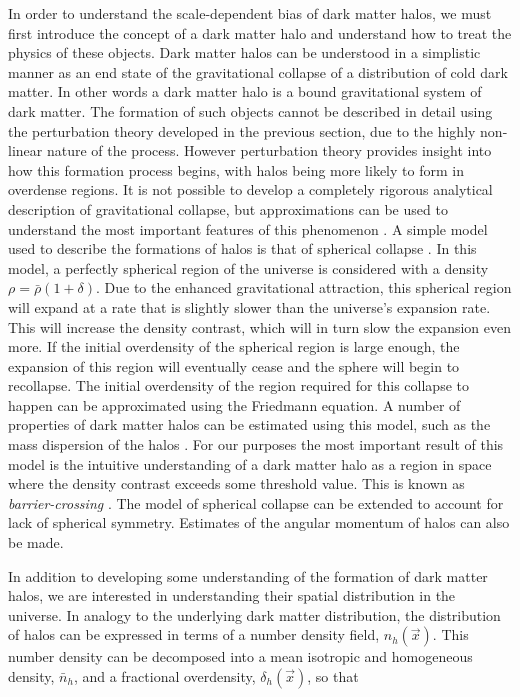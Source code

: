 \documentclass[10pt,letterpaper,final]{iopart}
\numberwithin{equation}{subsection}
\begin{document}
In order to understand the scale-dependent bias of dark matter halos, we must first introduce the concept of a dark matter halo and understand how to treat the physics of these objects. Dark matter halos can be understood in a simplistic manner as an end state of the gravitational collapse of a distribution of cold dark matter. In other words a dark matter halo is a bound gravitational system of dark matter. The formation of such objects cannot be described in detail using the perturbation theory developed in the previous section, due to the highly non-linear nature of the process. However perturbation theory provides insight into how this formation process begins, with halos being more likely to form in overdense regions. It is not possible to develop a completely rigorous analytical description of gravitational collapse, but approximations can be used to understand the most important features of this phenomenon \cite{Schneider}\cite{Dodelson}. A simple model used to describe the formations of halos is that of spherical collapse \cite{Schneider}\cite{Dodelson}. In this model, a perfectly spherical region of the universe is considered with a density $\rho = \bar{\rho}\left(1 + \delta \right)$. Due to the enhanced gravitational attraction, this spherical region will expand at a rate that is slightly slower than the universe's expansion rate. This will increase the density contrast, which will in turn slow the expansion even more. If the initial overdensity of the spherical region is large enough, the expansion of this region will eventually cease and the sphere will begin to recollapse. The initial overdensity of the region required for this collapse to happen can be approximated using the Friedmann equation. A number of properties of dark matter halos can be estimated using this model, such as the mass dispersion of the halos \cite{Schneider}\cite{Dodelson}\cite{PressSchec}. For our purposes the most important result of this model is the intuitive understanding of a dark matter halo as a region in space where the density contrast exceeds some threshold value. This is known as \emph{barrier-crossing} \cite{Schneider}\cite{Dodelson}\cite{PressSchec}\cite{Halo1}\cite{Halo2}. The model of spherical collapse can be extended to account for lack of spherical symmetry. Estimates of the angular momentum of halos can also be made.

In addition to developing some understanding of the formation of dark matter halos, we are interested in understanding their spatial distribution in the universe. In analogy to the underlying dark matter distribution, the distribution of halos can be expressed in terms of a number density field, $n_h(\vec{x})$. This number density can be decomposed into a mean isotropic and homogeneous density, $\bar{n}_h$, and a fractional overdensity, $\delta_h(\vec{x})$, so that
\end{document}
